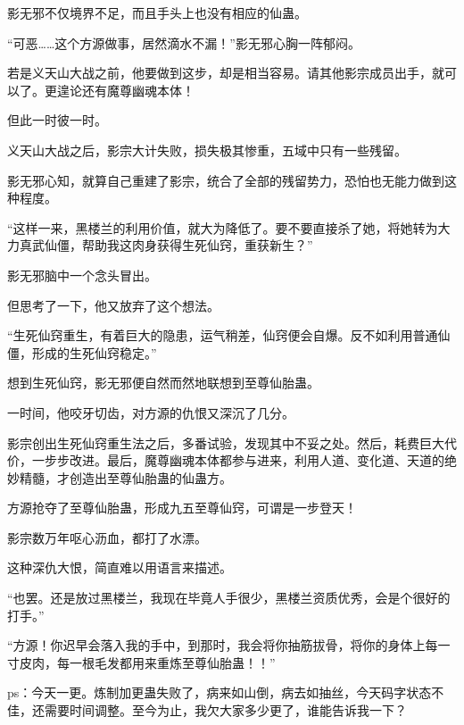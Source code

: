 \begin{this_body}
影无邪不仅境界不足，而且手头上也没有相应的仙蛊。

“可恶……这个方源做事，居然滴水不漏！”影无邪心胸一阵郁闷。

若是义天山大战之前，他要做到这步，却是相当容易。请其他影宗成员出手，就可以了。更遑论还有魔尊幽魂本体！

但此一时彼一时。

义天山大战之后，影宗大计失败，损失极其惨重，五域中只有一些残留。

影无邪心知，就算自己重建了影宗，统合了全部的残留势力，恐怕也无能力做到这种程度。

“这样一来，黑楼兰的利用价值，就大为降低了。要不要直接杀了她，将她转为大力真武仙僵，帮助我这肉身获得生死仙窍，重获新生？”

影无邪脑中一个念头冒出。

但思考了一下，他又放弃了这个想法。

“生死仙窍重生，有着巨大的隐患，运气稍差，仙窍便会自爆。反不如利用普通仙僵，形成的生死仙窍稳定。”

想到生死仙窍，影无邪便自然而然地联想到至尊仙胎蛊。

一时间，他咬牙切齿，对方源的仇恨又深沉了几分。

影宗创出生死仙窍重生法之后，多番试验，发现其中不妥之处。然后，耗费巨大代价，一步步改进。最后，魔尊幽魂本体都参与进来，利用人道、变化道、天道的绝妙精髓，才创造出至尊仙胎蛊的仙蛊方。

方源抢夺了至尊仙胎蛊，形成九五至尊仙窍，可谓是一步登天！

影宗数万年呕心沥血，都打了水漂。

这种深仇大恨，简直难以用语言来描述。

“也罢。还是放过黑楼兰，我现在毕竟人手很少，黑楼兰资质优秀，会是个很好的打手。”

“方源！你迟早会落入我的手中，到那时，我会将你抽筋拔骨，将你的身体上每一寸皮肉，每一根毛发都用来重炼至尊仙胎蛊！！”

ps：今天一更。炼制加更蛊失败了，病来如山倒，病去如抽丝，今天码字状态不佳，还需要时间调整。至今为止，我欠大家多少更了，谁能告诉我一下？

\end{this_body}

